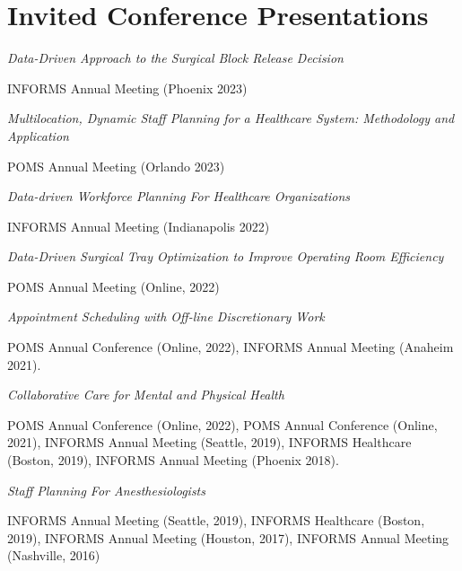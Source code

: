 \documentclass[11pt,a4paper]{article}
\renewenvironment{itemize}{
	\begin{list}{}{
			\setlength{\leftmargin}{1.5em}
		}
	}{
\end{list}
}
\begin{document}
	\section*{\textbf{Invited Conference Presentations}}
	\begin{itemize}
			\item \emph{Data-Driven Approach to the Surgical Block Release Decision}
		\begin{itemize}
			\item INFORMS Annual Meeting (Phoenix 2023) 
		\end{itemize}
		\item \emph{Multilocation, Dynamic Staff Planning for a Healthcare System: Methodology and Application}
		\begin{itemize}
			\item POMS Annual Meeting (Orlando 2023) 
		\end{itemize}
		\item \emph{Data-driven Workforce Planning For Healthcare Organizations}
		\begin{itemize}
			\item INFORMS Annual Meeting (Indianapolis 2022) 
		\end{itemize}
		
		\item \emph{Data-Driven Surgical Tray Optimization to Improve Operating Room Efficiency}
		\begin{itemize}
			\item POMS Annual Meeting (Online, 2022)
		\end{itemize}
		\item \emph{Appointment Scheduling with Off-line Discretionary Work}
		\begin{itemize}
			\item POMS Annual Conference (Online, 2022), INFORMS Annual Meeting  (Anaheim 2021).
		\end{itemize}
		\item \emph{Collaborative Care for Mental and Physical Health}
		\begin{itemize}
			\item POMS Annual Conference (Online, 2022), POMS Annual Conference (Online, 2021), INFORMS Annual Meeting (Seattle, 2019), INFORMS Healthcare (Boston, 2019), INFORMS Annual Meeting (Phoenix 2018).

		\end{itemize}
		\item \emph{Staff Planning For Anesthesiologists}
		\begin{itemize}
			\item INFORMS Annual Meeting (Seattle, 2019), INFORMS Healthcare (Boston, 2019), INFORMS Annual Meeting (Houston, 2017), INFORMS Annual Meeting (Nashville, 2016)


\end{itemize}
\end{itemize}
\end{document}
